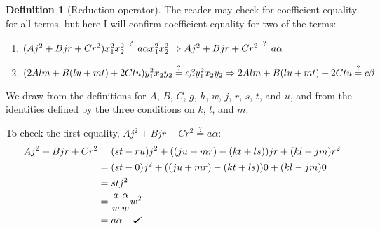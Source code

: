 \documentclass{article}
\def\checkmark{\tikz\fill[scale=0.4](0,.35) -- (.25,0) -- (1,.7) -- (.25,.15) -- cycle;}
\theoremstyle{definition}
\newtheorem{definition}{Definition}[section]
\theoremstyle{theorem}
\theoremstyle{example}
\theoremstyle{corollary}
\begin{document}
\begin{definition}[Reduction operator]
\bigskip

The reader may check for coefficient equality for all terms, but here I will confirm coefficient equality for two of the terms:
\begin{enumerate}
\item \((A j^{2} + B j r + C r^{2}) x_{1}^{2} x_{2}^{2} \stackrel{?}{=} a \alpha x_{1}^{2} x_{2}^{2} \\ \Rightarrow A j^{2} + B j r + C r^{2} \stackrel{?}{=} a \alpha\)
\item \((2 A l m + B (l u + m t) + 2 C t u) y_{1}^{2} x_{2} y_{2} \stackrel{?}{=} c \beta y_{1}^{2} x_{2} y_{2} \\ \Rightarrow 2 A l m + B (l u + m t) + 2 C t u \stackrel{?}{=} c \beta\)
\end{enumerate}

\bigskip

We draw from the definitions for \(A\), \(B\), \(C\), \(g\), \(h\), \(w\), \(j\), \(r\), \(s\), \(t\), and \(u\), and from the identities defined by the three conditions on \(k\), \(l\), and \(m\).

\bigskip

To check the first equality, \(A j^{2} + B j r + C r^{2} \stackrel{?}{=} a \alpha\):
\begin{align*}
A j^{2} + B j r + C r^{2} &= (s t - r u) j^{2} + ((j u + m r) - (k t + l s)) j r + (k l - j m) r^{2} \\
&= (s t - 0) j^{2} + ((j u + m r) - (k t + l s)) 0 + (k l - j m) 0 \\
& = s t j^{2} \\
&= \frac{a}{w} \frac{\alpha}{w} w^{2} \\
&= a \alpha \quad \checkmark
\end{align*}

\bigskip


\end{definition}
\end{document}

